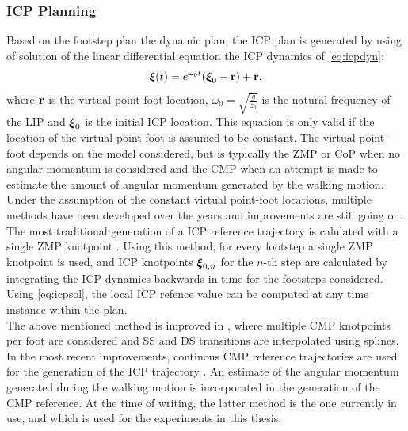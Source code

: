 \subsubsection{ICP Planning}\label{subsec:icpplan}
Based on the footstep plan the dynamic plan, the \ac{ICP} plan is generated by using of solution of the linear differential equation the \ac{ICP} dynamics of \eqref{eq:icpdyn}:
\begin{equation}\label{eq:icpsol}
	\boldsymbol{\xi}(t)=e^{\omega_0t}(\boldsymbol{\xi}_0- \mathbf{r}) + \mathbf{r},
\end{equation}
where $\mathbf{r}$ is the virtual point-foot location, $\omega_0=\sqrt{\frac{g}{z_0}}$ is the natural frequency of the \ac{LIP} and $\boldsymbol{\xi}_0$ is the initial \ac{ICP} location. This equation is only valid if the location of the virtual point-foot is assumed to be constant. The virtual point-foot depends on the model considered, but is typically the \ac{ZMP} or \ac{CoP} when no angular momentum is considered and the \ac{CMP} when an attempt is made to estimate the amount of angular momentum generated by the walking motion. Under the assumption of the constant virtual point-foot locations, multiple methods have been developed over the years and improvements are still going on. The most traditional generation of a \ac{ICP} reference trajectory is calulated with a single \ac{ZMP} knotpoint \cite{englsberger2012integration}. Using this method, for every footstep a single \ac{ZMP} knotpoint is used, and \ac{ICP} knotpoints $\boldsymbol{\xi}_{0,n}$ for the $n$-th step are calculated by integrating the \ac{ICP} dynamics backwards in time for the footsteps considered. Using \eqref{eq:icpsol}, the local \ac{ICP} refence value can be computed at any time instance within the plan. \\
The above mentioned method is improved in \cite{englsberger2014trajectory}, where multiple \ac{CMP} knotpoints per foot are considered and \ac{SS} and \ac{DS} transitions are interpolated using splines. In the most recent improvements, continous \ac{CMP} reference trajectories are used for the generation of the \ac{ICP} trajectory \cite{seyde2018inclusion}. An estimate of the angular momentum generated during the walking motion is incorporated in the generation of the \ac{CMP} reference. At the time of writing, the latter method is the one currently in use, and which is used for the experiments in this thesis.
